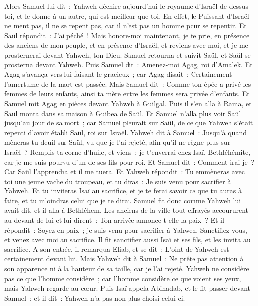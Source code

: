 \begin{multicols}{2}
Alors Samuel lui dit~: Yahweh déchire aujourd'hui le royaume d'Israël de dessus toi, et le donne à un autre, qui est meilleur que toi.
En effet, le Puissant d'Israël ne ment pas, il ne se repent pas, car il n'est pas un homme pour se repentir.
Et Saül répondit~: J'ai péché~! Mais honore-moi maintenant, je te prie, en présence des anciens de mon peuple, et en présence d'Israël, et reviens avec moi, et je me prosternerai devant Yahweh, ton Dieu.
Samuel retourna et suivit Saül, et Saül se prosterna devant Yahweh.
Puis Samuel dit~: Amenez-moi Agag, roi d'Amalek. Et Agag s'avança vers lui faisant le gracieux~; car Agag disait~: Certainement l'amertume de la mort est passée.
Mais Samuel dit~: Comme ton épée a privé les femmes de leurs enfants, ainsi ta mère entre les femmes sera privée d'enfants. Et Samuel mit Agag en pièces devant Yahweh à Guilgal.
Puis il s'en alla à Rama, et Saül monta dans sa maison à Guibea de Saül.
Et Samuel n'alla plus voir Saül jusqu'au jour de sa mort~; car Samuel pleurait sur Saül, de ce que Yahweh s'était repenti d'avoir établi Saül, roi sur Israël.
\VerseOne{}Yahweh dit à Samuel~: Jusqu'à quand mèneras-tu deuil sur Saül, vu que je l'ai rejeté, afin qu'il ne règne plus sur Israël~? Remplis ta corne d'huile, et viens~; je t'enverrai chez Isaï, Bethléhémite, car je me suis pourvu d'un de ses fils pour roi.
Et Samuel dit~: Comment irai-je~? Car Saül l'apprendra et il me tuera. Et Yahweh répondit~: Tu emmèneras avec toi une jeune vache du troupeau, et tu diras~: Je suis venu pour sacrifier à Yahweh.
Et tu inviteras Isaï au sacrifice, et je te ferai savoir ce que tu auras à faire, et tu m'oindras celui que je te dirai.
Samuel fit donc comme Yahweh lui avait dit, et il alla à Bethléhem. Les anciens de la ville tout effrayés accoururent au-devant de lui et lui dirent~: Ton arrivée annonce-t-elle la paix~?
Et il répondit~: Soyez en paix~; je suis venu pour sacrifier à Yahweh. Sanctifiez-vous, et venez avec moi au sacrifice. Il fit sanctifier aussi Isaï et ses fils, et les invita au sacrifice.
A son entrée, il remarqua Eliab, et se dit~: L'oint de Yahweh est certainement devant lui.
Mais Yahweh dit à Samuel~: Ne prête pas attention à son apparence ni à la hauteur de sa taille, car je l'ai rejeté. Yahweh ne considère pas ce que l'homme considère~; car l'homme considère ce que voient ses yeux, mais Yahweh regarde au cœur.
Puis Isaï appela Abinadab, et le fit passer devant Samuel~; et il dit~: Yahweh n'a pas non plus choisi celui-ci.

\end{multicols}
